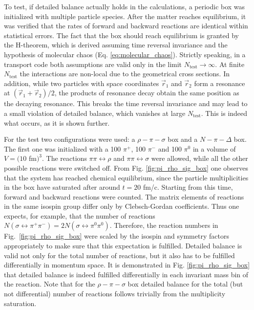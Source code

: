 To test, if detailed balance actually holds in the calculations, a periodic
box was initialized with multiple particle species. After the matter reaches
equilibrium, it was verified that the rates of forward and backward reactions
are identical within statistical errors. The fact that the box should reach
equilibrium is granted by the H-theorem, which is derived assuming time
reversal invariance and the hypothesis of molecular chaos (Eq.
\ref{eq:molecular_chaos}). Strictly speaking, in a transport code both assumptions
are valid only in the limit $N_\text{test} \to \infty$. At finite
$N_\text{test}$ the interactions are non-local due to the geometrical cross
sections.  In addition, while two particles with space coordinates $\vec{r}_1$
and $\vec{r}_2$ form a resonance at $(\vec{r}_1 + \vec{r}_2)/2$, the products
of resonance decay obtain the same position as the decaying resonance. This
breaks the time reversal invariance and may lead to a small violation of
detailed balance, which vanishes at large $N_\text{test}$. This is indeed what
occurs, as it is shown further.

For the test two configurations were used: a $\rho-\pi-\sigma$ box and a
$N-\pi-\Delta$ box. The first one was initialized with a 100 $\pi^+$, 100
$\pi^-$ and 100 $\pi^0$ in a volume of $V = (10$ fm$)^3$. The reactions $\pi\pi
\leftrightarrow \rho$ and $\pi\pi \leftrightarrow \sigma$ were allowed, while
all the other possible reactions were switched off. From
Fig. \ref{fig:pi_rho_sig_box} one observes that the system has reached chemical
equilibrium, since the particle multiplicities in the box have saturated after around
$t=20$ fm/c. Starting from this time, forward and backward reactions were
counted. The matrix elements of reactions in the same isospin group differ only
by Clebsch-Gordan coefficients. Thus one expects, for example, that the number
of reactions $N(\sigma \leftrightarrow \pi^+ \pi^-) = 2 N(\sigma
\leftrightarrow \pi^0 \pi^0)$. Therefore, the reaction numbers in
Fig.~\ref{fig:pi_rho_sig_box} were scaled by the isospin and symmetry factors
appropriately to make sure that this expectation is fulfilled.  Detailed
balance is valid not only for the total number of reactions, but it also has to
be fulfilled differentially in momentum space. It is demonstrated in
Fig. \ref{fig:pi_rho_sig_box} that detailed balance is indeed fulfilled
differentially in each invariant mass bin of the reaction.  Note that
for the $\rho-\pi-\sigma$ box detailed balance for the total (but not
differential) number of reactions follows trivially from the multiplicity
saturation.

